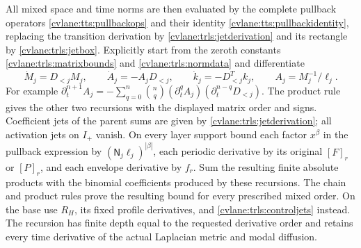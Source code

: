 All mixed space and time norms are then evaluated by the complete
pullback operators \eqref{cvlane:tts:pullbackops} and their identity
\eqref{cvlane:tts:pullbackidentity}, replacing the transition derivation
by \eqref{cvlane:trls:jetderivation} and its rectangle by
\eqref{cvlane:trls:jetbox}. Explicitly start from the zeroth constants
\eqref{cvlane:trls:matrixbounds} and \eqref{cvlane:trls:normdata} and
differentiate
\[
 \dot M_j=D_{<j}M_j,\qquad
 \dot A_j=-A_jD_{<j},\qquad
 \dot k_j=-D_{<j}^Tk_j,\qquad A_j=M_j^{-1}/\ell_j.
\]
For example
$\partial_t^{n+1}A_j=-\sum_{q=0}^n\binom nq
(\partial_t^qA_j)(\partial_t^{n-q}D_{<j})$.
The product rule gives the other two recursions with the displayed
matrix order and signs. Coefficient jets of the parent sums are
given by \eqref{cvlane:trls:jetderivation}; all activation jets on
$I_+$ vanish. On every layer support bound each factor $x^\beta$
in the pullback expression by
$(\mathsf N_j\ell_j)^{|\beta|}$, each periodic derivative
by its original $[F]_r$ or $[P]_r$, and each envelope derivative
by $f_r$. Sum the resulting finite absolute products with the
binomial coefficients produced by these recursions. The chain and
product rules prove the resulting bound for every prescribed mixed
order. On the base use $R_H$, its fixed profile derivatives, and
\eqref{cvlane:trls:controljets} instead. The recursion has finite depth
equal to the requested derivative order and retains every time
derivative of the actual Laplacian metric and modal diffusion.

